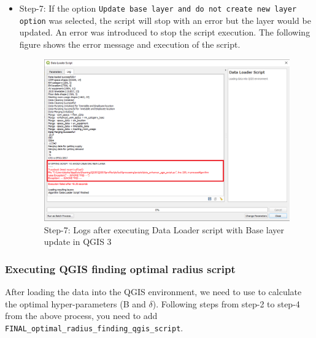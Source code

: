 \begin{itemize}
\item Step-7: If the option \texttt{Update base layer and do not create new layer option} was selected, the script will stop with an error but the layer would be updated. An error was introduced to stop the script execution. The following figure shows the error message and execution of the script.
\begin{figure}[H]
\centering
\includegraphics[width=12cm,keepaspectratio=true]{resources/update.PNG}
\caption{Step-7: Logs after executing Data Loader script with Base layer update in QGIS 3}
\label{fig:update}
\end{figure}
\end{itemize}

\subsubsection{Executing QGIS finding optimal radius script}
After loading the data into the QGIS environment, we need to use to calculate the optimal hyper-parameters (B and $\delta$). Following steps from step-2 to step-4 from the above process, you need to add \texttt{FINAL\_optimal\_radius\_finding\_qgis\_script}.

